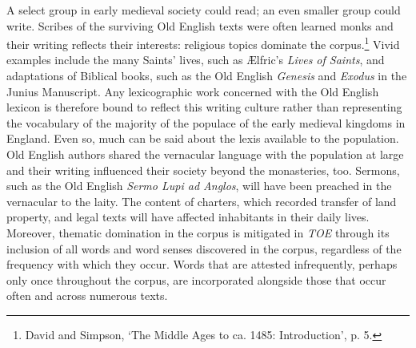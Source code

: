A select group in early medieval society could read; an even smaller group could write. Scribes of the surviving Old English texts were often learned monks and their writing reflects their interests: religious topics dominate the corpus.\footnote{David and Simpson, `The Middle Ages to ca. 1485: Introduction’, p. 5.} Vivid examples include the many Saints' lives, such as Ælfric's \textit{Lives of Saints}, and adaptations of Biblical books, such as the Old English \textit{Genesis} and \textit{Exodus} in the Junius Manuscript. Any lexicographic work concerned with the Old English lexicon is therefore bound to reflect this writing culture rather than representing the vocabulary of the majority of the populace of the early medieval kingdoms in England. Even so, much can be said about the lexis available to the population. Old English authors shared the vernacular language with the population at large and their writing influenced their society beyond the monasteries, too. Sermons, such as the Old English \textit{Sermo Lupi ad Anglos}, will have been preached in the vernacular to the laity. The content of charters, which recorded transfer of land property, and legal texts will have affected inhabitants in their daily lives. Moreover, thematic domination in the corpus is mitigated in \textit{TOE} through its inclusion of all words and word senses discovered in the corpus, regardless of the frequency with which they occur. Words that are attested infrequently, perhaps only once throughout the corpus, are incorporated alongside those that occur often and across numerous texts.

